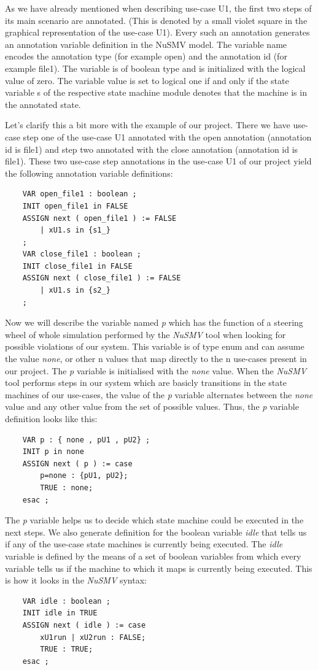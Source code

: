 As we have already mentioned when describing use-case U1, the first two steps of its main scenario are annotated. (This is denoted
by a small violet square in the graphical representation of the use-case U1). Every such an annotation generates an annotation variable
definition in the NuSMV model. The variable name encodes the annotation type (for example open) and the annotation id (for example
file1). The variable is of boolean type and is initialized with the logical value of zero. The variable value is set to logical one
if and only if the state variable s of the respective state machine module denotes that the machine is in the annotated state.

Let's clarify this a bit more with the example of our project. There we have use-case step one of the use-case U1 annotated with the
open annotation (annotation id is file1) and step two annotated with the close annotation (annotation id is file1). These two use-case
step annotations in the use-case U1 of our project yield the following annotation variable definitions:

\begin{lstlisting}
 	VAR open_file1 : boolean ;
	INIT open_file1 in FALSE
	ASSIGN next ( open_file1 ) := FALSE
		| xU1.s in {s1_}
	;
	VAR close_file1 : boolean ;
	INIT close_file1 in FALSE
	ASSIGN next ( close_file1 ) := FALSE
		| xU1.s in {s2_}
	;
\end{lstlisting}

Now we will describe the variable named \emph{p} which has the function of a steering wheel of whole simulation performed by the \emph{NuSMV} tool
when looking for possible violations of our system. This variable is of type enum and can assume the value \emph{none}, or other n values that
map directly to the n use-cases present in our project. The \emph{p} variable is initialised with the \emph{none} value. When the \emph{NuSMV} tool performs
steps in our system which are basicly transitions in the state machines of our use-cases, the value of the \emph{p} variable alternates between
the \emph{none} value and any other value from the set of possible values. Thus, the \emph{p} variable definition looks like this:
\begin{lstlisting}
 	VAR p : { none , pU1 , pU2} ;
	INIT p in none
	ASSIGN next ( p ) := case
		p=none : {pU1, pU2};
		TRUE : none;
	esac ;
\end{lstlisting}

The \emph{p} variable helps us to decide which state machine could be executed in the next steps. We also generate definition for the
boolean variable \emph{idle} that tells us if any of the use-case state machines is currently being executed. The \emph{idle} variable is defined
by the means of a set of boolean variables from which every variable tells us if the machine to which it maps is currently
being executed. This is how it looks in the \emph{NuSMV} syntax:
\begin{lstlisting}
 	VAR idle : boolean ;
	INIT idle in TRUE
	ASSIGN next ( idle ) := case
		xU1run | xU2run : FALSE;
		TRUE : TRUE;
	esac ;
\end{lstlisting}


